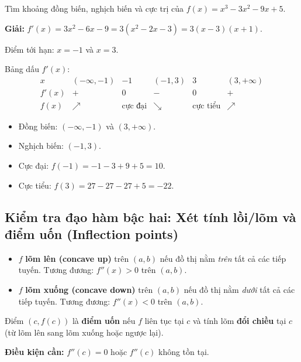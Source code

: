 \documentclass[12pt,a4paper]{article}
\begin{document}
\begin{vidu}
  Tìm khoảng đồng biến, nghịch biến và cực trị của $f(x) = x^3 - 3x^2 - 9x + 5$.

  \medskip\textbf{Giải:}
  $f'(x) = 3x^2 - 6x - 9 = 3(x^2 - 2x - 3) = 3(x-3)(x+1)$.

  Điểm tới hạn: $x = -1$ và $x = 3$.

  Bảng dấu $f'(x)$:
  \[
    \begin{array}{c|cccccc}
      x & (-\infty,-1) & -1 & (-1,3) & 3 & (3,+\infty) \\
      \hline
      f'(x) & + & 0 & - & 0 & + \\
      \hline
      f(x) & \nearrow & \text{cực đại} & \searrow & \text{cực tiểu} & \nearrow
    \end{array}
  \]

  \begin{itemize}
    \item Đồng biến: $(-\infty, -1)$ và $(3, +\infty)$.
    \item Nghịch biến: $(-1, 3)$.
    \item Cực đại: $f(-1) = -1 - 3 + 9 + 5 = 10$.
    \item Cực tiểu: $f(3) = 27 - 27 - 27 + 5 = -22$.
  \end{itemize}
\end{vidu}

\subsection{Kiểm tra đạo hàm bậc hai: Xét tính lồi/lõm và điểm uốn (Inflection points)}

\begin{dinhnghia}[title={Tính lồi và lõm (Concavity)}]
  \begin{itemize}
    \item $f$ \textbf{lõm lên (concave up)} trên $(a,b)$ nếu đồ thị nằm \textit{trên} tất cả các tiếp tuyến. Tương đương: $f''(x) > 0$ trên $(a,b)$.
    \item $f$ \textbf{lõm xuống (concave down)} trên $(a,b)$ nếu đồ thị nằm \textit{dưới} tất cả các tiếp tuyến. Tương đương: $f''(x) < 0$ trên $(a,b)$.
  \end{itemize}
\end{dinhnghia}

\begin{dinhnghia}[title={Điểm uốn (Inflection Point)}]
  Điểm $(c, f(c))$ là \textbf{điểm uốn} nếu $f$ liên tục tại $c$ và tính lõm \textbf{đổi chiều} tại $c$ (từ lõm lên sang lõm xuống hoặc ngược lại).

  \textbf{Điều kiện cần:} $f''(c) = 0$ hoặc $f''(c)$ không tồn tại.
\end{dinhnghia}
\end{document}
